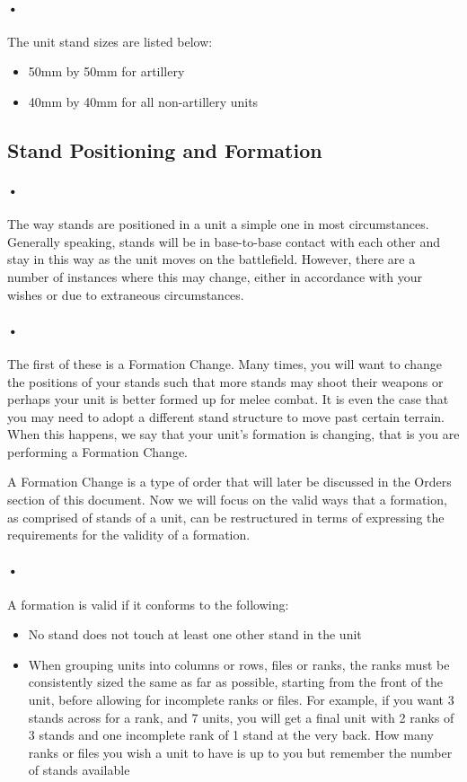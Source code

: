 \documentclass{article}
\begin{document}
\paragraph{•}
The unit stand sizes are listed below:
\begin{itemize}
\item 50mm by 50mm for artillery
\item 40mm by 40mm for all non-artillery units
\end{itemize} 

\subsection{Stand Positioning and Formation}
\paragraph{•}
The way stands are positioned in a unit a simple one in most circumstances. Generally speaking, stands will be in base-to-base contact with each other and stay in this way as the unit moves on the battlefield. However, there are a number of instances where this may change, either in accordance with your wishes or due to extraneous circumstances.

\paragraph{•}
The first of these is a Formation Change. Many times, you will want to change the positions of your stands such that more stands may shoot their weapons or perhaps your unit is better formed up for melee combat. It is even the case that you may need to adopt a different stand structure to move past certain terrain. When this happens, we say that your unit's formation is changing, that is you are performing a Formation Change.

A Formation Change is a type of order that will later be discussed in the Orders section of this document. Now we will focus on the valid ways that a formation, as comprised of stands of a unit, can be restructured in terms of expressing the requirements for the validity of a formation.

\paragraph{•}
A formation is valid if it conforms to the following:
\begin{itemize}
\item No stand does not touch at least one other stand in the unit
\item When grouping units into columns or rows, files or ranks, the ranks must be consistently sized the same as far as possible, starting from the front of the unit, before allowing for incomplete ranks or files. For example, if you want 3 stands across for a rank, and 7 units, you will get a final unit with 2 ranks of 3 stands and one incomplete rank of 1 stand at the very back. How many ranks or files you wish a unit to have is up to you but remember the number of stands available
\end{itemize}
\end{document}
